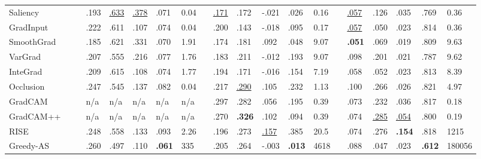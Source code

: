 \begin{table}[t]
{\begin{tabular}{l C{0mm} P{0mm} P{5mm}P{5mm}P{5mm}P{5mm}P{5mm} P{1mm} P{5mm}P{5mm}P{9mm}P{5mm}P{5mm} P{1mm} P{5mm}P{5mm}P{5mm}P{5mm}P{5mm}}
        \midrule
        Saliency\cite{simonyan2013deep} &   && .193 & \underline{.633} & \underline{.378} & .071 & 0.04
                 && \underline{.171} & .172 & -.021 & .026 & 0.16
                 && \underline{.057} & .126 & .035 & .769 & 0.36 \\
        GradInput\cite{ancona2017better} &   && .222 & .611 & .107 & .074 & 0.04 
                 && .200 & .143 & -.018 & .095 & 0.17
                 && \underline{.057} & .050 & .023 & .814 & 0.36  \\
        SmoothGrad\cite{smilkov2017smoothgrad} &   && .185 & .621 & .331  & .070 & 1.91
                 && .174 & .181 & .092 & .048 & 9.07
                 && \textbf{.051} & .069 & .019 & .809 & 9.63 \\
        VarGrad\cite{seo2018noise} &   && .207   & .555   & .216   & .077   & 1.76 
                 && .183 & .211 & -.012 & .193 & 9.07
                 && .098 & .201 & .021 & .787 &  9.62 \\
        InteGrad\cite{sundararajan2017axiomatic} &   && .209 & .615 & .108 & .074 & 1.77
                 && .194 & .171 & -.016 & .154 & 7.19
                 && .058 & .052 & .023 & .813 & 8.39 \\
        Occlusion\cite{ancona2017better} &   && .247  & .545  & .137  & .082  & 0.04 
                 && .217 & \underline{.290} & .105 & .232 & 1.13
                 && .100 & .266 & .026 & .821 & 4.97 \\
        GradCAM\cite{Selvaraju_2019} &   && n/a &  n/a  &  n/a  &  n/a  &  n/a  
                 && .297 & .282 & .056 & .195 & 0.39
                 && .073 & .232 & .036 & .817 & 0.18 \\
        GradCAM++\cite{chattopadhay2018grad} &   && n/a  & n/a & n/a & n/a & n/a
                 && .270 & \textbf{.326} & .102 & .094 & 0.39
                 && .074 & \underline{.285} & \underline{.054} & .800 & 0.19 \\
        RISE\cite{petsiuk2018rise}     &   && .248  & .558 & .133  & .093  & 2.26 
                 && .196 & .273  & \underline{.157} & .385 & 20.5
                 && .074 & .276 & \textbf{.154} & .818 & 1215 \\
        Greedy-AS\cite{hsieh2020evaluations} &   && .260  & .497  & .110  & \textbf{.061}  & 335
                 && .205 & .264 & -.003 & \textbf{.013} & 4618
                 && .088 & .047 & .023 & \textbf{.612} & 180056  \\
        \midrule 

\end{tabular}}
\end{table}
